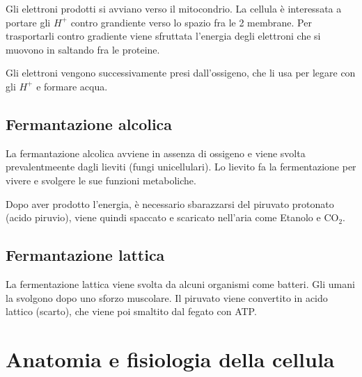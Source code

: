 \documentclass[a4paper]{article}
\begin{document}
Gli elettroni prodotti si avviano verso il mitocondrio. La cellula è interessata a portare
gli \(H^+\) contro grandiente verso lo spazio fra le 2 membrane.
Per trasportarli contro gradiente viene sfruttata l'energia degli elettroni che si muovono in saltando fra le proteine.

Gli elettroni vengono successivamente presi dall'ossigeno, che li usa per legare con gli \(H^+\) e formare
acqua.

\subsection{Fermantazione alcolica}

La fermantazione alcolica avviene in assenza di ossigeno e viene svolta prevalentmeente dagli lieviti (fungi unicellulari).
Lo lievito fa la fermentazione per vivere e svolgere le sue funzioni metaboliche.

Dopo aver prodotto l'energia, è necessario sbarazzarsi del piruvato protonato (acido piruvio),
viene quindi spaccato e scaricato nell'aria come Etanolo e CO\({}_2\).

\subsection{Fermantazione lattica}

La fermentazione lattica viene svolta da alcuni organismi come batteri.
Gli umani la svolgono dopo uno sforzo muscolare.
Il piruvato viene convertito in acido lattico (scarto), che viene poi smaltito dal fegato con ATP.

\pagebreak

\section{Anatomia e fisiologia della cellula}


\end{document}
